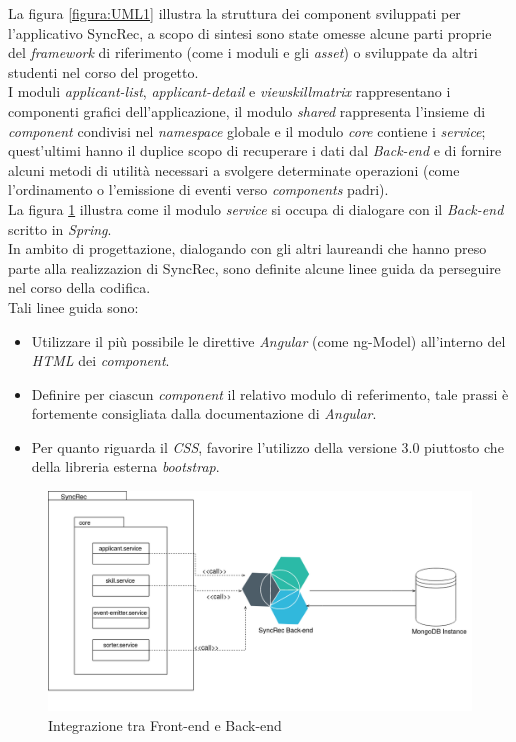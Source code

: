 La figura \ref{figura:UML1} illustra la struttura dei component sviluppati per l'applicativo SyncRec, a scopo di sintesi sono state omesse alcune parti proprie del \textit{framework} di riferimento (come i moduli e gli \textit{asset}) o sviluppate da altri studenti nel corso del progetto.\\
I moduli \textit{applicant-list}, \textit{applicant-detail} e \textit{viewskillmatrix} rappresentano i componenti grafici dell'applicazione, il modulo \textit{shared} rappresenta l'insieme di \textit{component} condivisi nel \textit{namespace} globale e il modulo \textit{core} contiene i \textit{service}; quest'ultimi hanno il duplice scopo di recuperare i dati dal \textit{Back-end} e di fornire alcuni metodi di utilità necessari a svolgere determinate operazioni (come l'ordinamento o l'emissione di eventi verso \textit{components} padri).\\
La figura \ref{figura:UML2} illustra come il modulo \textit{service} si occupa di dialogare con il \textit{Back-end} scritto in \textit{Spring}.\\
In ambito di progettazione, dialogando con gli altri laureandi che hanno preso parte alla realizzazion di SyncRec, sono definite alcune linee guida da perseguire nel corso della codifica.\\
Tali linee guida sono:
\begin{itemize}
	\item Utilizzare il più possibile le direttive \textit{Angular} (come \gls{ng-Model}) all'interno del \textit{HTML} dei \textit{component}.
	\item Definire per ciascun \textit{component} il relativo modulo di referimento, tale prassi è fortemente consigliata dalla documentazione di \textit{Angular}.
	\item Per quanto riguarda il \textit{CSS}, favorire l'utilizzo della versione 3.0 piuttosto che della libreria esterna \textit{bootstrap}.
\end{itemize}

\begin{figure}[!h] 
	\centering 
	\includegraphics[width=1\columnwidth]{immagini/usecase/UML2} 
	\caption{Integrazione tra Front-end e Back-end}
	\label{figura:UML2}
\end{figure}

